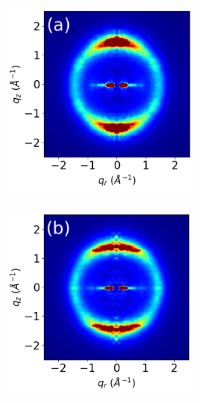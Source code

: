 \documentclass[journal=jpcbfk,manuscript=article]{achemso}
\begin{document}
  \begin{figure}[!htb]
	\centering
	\begin{subfigure}{0.905\textwidth}
	\begin{subfigure}{0.28\linewidth}
			\begin{subfigure}{\textwidth}
			\centering
		        	\includegraphics[width=\linewidth]{rzplot_layered_300K_jet_nocbar.pdf}
			\end{subfigure}
			\begin{subfigure}{\textwidth}
		       		\centering
	        		\includegraphics[width=\linewidth]{rzplot_layered_300K_disorder_jet_nocbar.pdf}

\end{subfigure}
\end{subfigure}
\end{subfigure}
\end{figure}
\end{document}
